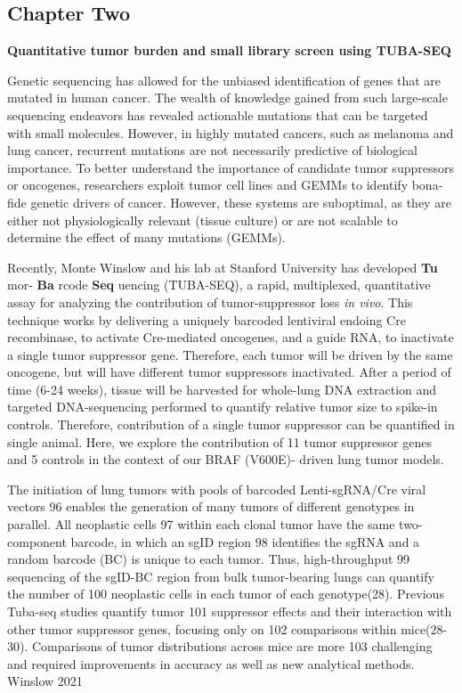 \hypertarget{chapter-two}{%
\subsection{Chapter Two}\label{chapter-two}}

\textbf{Quantitative tumor burden and small library screen using TUBA-SEQ}

Genetic sequencing has allowed for the unbiased identification of genes that are mutated in human cancer. The wealth of knowledge gained from such large-scale sequencing endeavors has revealed actionable mutations that can be targeted with small molecules. However, in highly mutated cancers, such as melanoma and lung cancer, recurrent mutations are not necessarily predictive of biological importance. To better understand the importance of candidate tumor suppressors or oncogenes, researchers exploit tumor cell lines and GEMMs to identify bona-fide genetic drivers of cancer. However, these systems are suboptimal, as they are either not physiologically relevant (tissue culture) or are not scalable to determine the effect of many mutations (GEMMs).

Recently, Monte Winslow and his lab at Stanford University has developed \textbf{Tu} mor- \textbf{Ba} rcode \textbf{Seq} uencing (TUBA-SEQ), a rapid, multiplexed, quantitative assay for analyzing the contribution of tumor-suppressor loss \emph{in vivo}. This technique works by delivering a uniquely barcoded lentiviral endoing Cre recombinase, to activate Cre-mediated oncogenes, and a guide RNA, to inactivate a single tumor suppressor gene. Therefore, each tumor will be driven by the same oncogene, but will have different tumor suppressors inactivated. After a period of time (6-24 weeks), tissue will be harvested for whole-lung DNA extraction and targeted DNA-sequencing performed to quantify relative tumor size to spike-in controls. Therefore, contribution of a single tumor suppressor can be quantified in single animal. Here, we explore the contribution of 11 tumor suppressor genes and 5 controls in the context of our BRAF (V600E)- driven lung tumor models.

The initiation of lung tumors with pools of barcoded Lenti-sgRNA/Cre viral vectors 96 enables the generation of many tumors of different genotypes in parallel. All neoplastic cells 97 within each clonal tumor have the same two-component barcode, in which an sgID region 98 identifies the sgRNA and a random barcode (BC) is unique to each tumor. Thus, high-throughput 99 sequencing of the sgID-BC region from bulk tumor-bearing lungs can quantify the number of 100 neoplastic cells in each tumor of each genotype(28). Previous Tuba-seq studies quantify tumor 101 suppressor effects and their interaction with other tumor suppressor genes, focusing only on 102 comparisons within mice(28-30). Comparisons of tumor distributions across mice are more 103 challenging and required improvements in accuracy as well as new analytical methods. Winslow 2021

